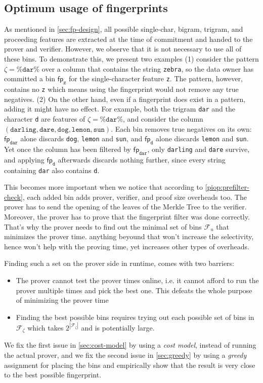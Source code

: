 \subsection{Optimum usage of fingerprints}
\label{sec:opt-fp}

As mentioned in \cref{sec:fp-design}, all possible single-char, bigram, trigram, and proceeding features are extracted at the time of commitment and handed to the prover and verifier. However, we observe that it is not necessary to use all of these bins. To demonstrate this, we present two examples (1) consider the pattern $\zeta = \texttt{\%dar\%}$ over a column that contains the string \texttt{zebra}, so the data owner has committed a bin $\mathsf{fp}_{\texttt{z}}$ for the single-character feature \texttt{z}. The pattern, however, contains no \texttt{z} which means using the fingerprint would not remove any true negatives. (2) On the other hand, even if a fingerprint does exist in a pattern, adding it might have no effect. For example, both the trigram \texttt{dar} and the character \texttt{d} are features of $\zeta = \texttt{\%dar\%}$, and consider the column $(\texttt{darling}, \texttt{dare}, \texttt{dog}, \texttt{lemon}, \texttt{sun})$. Each bin removes true negatives on its own: $\mathsf{fp}_{\texttt{dar}}$ alone discards \texttt{dog}, \texttt{lemon} and \texttt{sun}, and $\mathsf{fp}_{\texttt{d}}$ alone discards \texttt{lemon} and \texttt{sun}. Yet once the column has been filtered by $\mathsf{fp}_{\texttt{dar}}$, only \texttt{darling} and \texttt{dare} survive, and applying $\mathsf{fp}_{\texttt{d}}$ afterwards discards nothing further, since every string containing \texttt{dar} also contains \texttt{d}.

This becomes more important when we notice that according to \cref{piop:prefilter-check}, each added bin adds prover, verifier, and proof size overheads too. The prover has to send the opening of the leaves of the Merkle Tree to the verifier. Moreover, the prover has to prove that the fingerprint filter was done correctly. That's why the prover needs to find out the minimal set of bins $\mathcal{F}_u$ that minimizes the prover time. anything beyound that won't increase the selectivity, hence won't help with the proving time, yet increases other types of overheads.


Finding such a set on the prover side in runtime, comes with two barriers:
\begin{itemize}[nosep]
  \item The prover cannot test the prover times online, i.e. it cannot afford to run the prover multiple times and pick the best one. This defeats the whole purpose of minimizing the prover time 
  \item Finding the best possible bins requires trying out each possible set of bins in $\mathcal{F}_\zeta$ which takes $2^{|\mathcal{F}_\zeta|}$ and is potentially large.
\end{itemize}
We fix the first issue in \cref{sec:cost-model} by using a \emph{cost model}, instead of running the actual prover, and we fix the second issue in \cref{sec:greedy} by using a \emph{greedy} assignment for placing the bins and empirically show that the result is very close to the best possible fingerprint.


